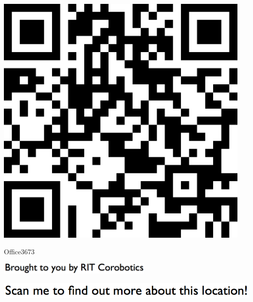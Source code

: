 \documentclass[letterpaper]{article}
\begin{document}
 \begingroup 
 \centerline{\includegraphics[scale=1,width=5in,height=5in]{Office3673.png}} 
 \endgroup 
 \vspace*{\fill} 

 \hfill{\small Office3673} 

  \vspace{0.7in} 
 
 \centerline{\includegraphics[scale=1,width=3in]{text-bottom.png}} 
 
 \pagebreak 
{} 
 \vspace*{\fill} 
 
  \centerline{\includegraphics[scale=1,width=6in]{text-top.png}} 
 
 \vspace{0.5in} 
 
\end{document}
